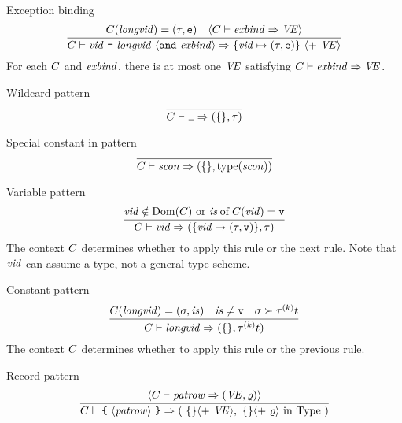 \begin{sml-rule}{Exception binding}
\begin{equation}\label{rule:static-core:exnbind2}
  \vcenter{\infer{\C\ts\longvidexnbindb\ra\{\vid\mapsto(\tau,\ise)\}\ \optional{+\ \VE}}
    {\C(\longvid)=(\tau,\ise)
      & \optional{\C\ts\exnbind\ra\VE}}}
\end{equation}
For each $C$ and $\textit{exbind\/}$, there is at most one $\textit{V\kern-.05emE\/}$ satisfying
$C\vdash\textit{exbind\/}\Rightarrow\textit{V\kern-.05emE\/}$.
\end{sml-rule}


\begin{sml-rule}{Wildcard pattern}
\begin{equation}\label{rule:static-core:wildcard-pattern}
\vcenter{\infer{\C\ts\wildcard\ra (\emptymap,\tau)}{}}
\end{equation}
\end{sml-rule}

\begin{sml-rule}{Special constant in pattern}
\begin{equation}\label{rule:static-core:atpat:scon}
\vcenter{\infer{\C\ts\scon\ra (\emptymap,\scontype(\scon))}{}}
\end{equation}
\end{sml-rule}

\begin{sml-rule}{Variable pattern}
\begin{equation}\label{rule:static-core:variable-pattern}
  \vcenter{\infer{\C\ts\vid\ra (\{\vid\mapsto(\tau,\isv)\},\tau)}
    {\hbox{$\vid\notin\Dom(\C)$ or $\of{\is}{C(\vid)} = \isv$}}}
\end{equation}
The context $C$ determines whether to apply this rule or the next rule.
Note that $\textit{vid\/}$ can assume a type, not a general type scheme.
\end{sml-rule}

\begin{sml-rule}{Constant pattern}
\begin{equation}\label{rule:static-core:constant-pattern}
  \vcenter{\infer{\C\ts\longvid\ra (\emptymap,\tauk\t)}
    {\C(\longvid)=(\sigma,\is)
      & \is\neq\isv
      & \sigma\succ\tauk\t}}
\end{equation}
The context $C$ determines whether to apply this rule or the previous rule.
\end{sml-rule}

\begin{sml-rule}{Record pattern}
\begin{equation}\label{rule:static-core:record-pattern}
  \vcenter{\infer{\C\ts\lttbrace\ \recpat\ \rttbrace\ra(\ \emptymap\optional{ +\ \VE},\ \emptymap
      \optional{ +\ \varrho}\ \In\ \Type\ )}
    {\optional{\C\ts\labpats\ra(\VE,\varrho)}}}
\end{equation}
\end{sml-rule}

